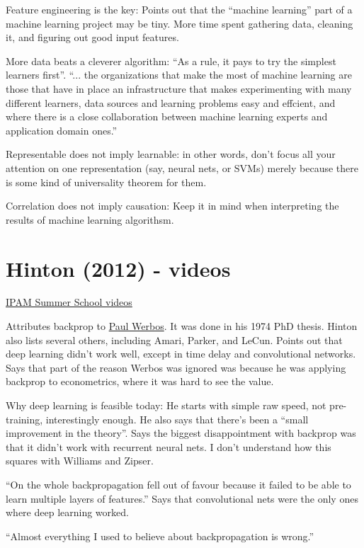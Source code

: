 \documentclass[12pt]{report}
\newcommand{\link}[2]{\href{#1}{#2}}
\begin{document}
Feature engineering is the key: Points out that the ``machine
learning'' part of a machine learning project may be tiny.  More time
spent gathering data, cleaning it, and figuring out good input
features.

More data beats a cleverer algorithm: ``As a rule, it pays to try the
simplest learners first''.  ``... the organizations that make the most
of machine learning are those that have in place an infrastructure
that makes experimenting with many different learners, data sources
and learning problems easy and effcient, and where there is a close
collaboration between machine learning experts and application domain
ones.''

Representable does not imply learnable: in other words, don't focus
all your attention on one representation (say, neural nets, or SVMs)
merely because there is some kind of universality theorem for them.

Correlation does not imply causation: Keep it in mind when
interpreting the results of machine learning algorithsm.

\section{Hinton (2012) - videos}

\link{https://www.ipam.ucla.edu/schedule.aspx?pc=gss2012}{IPAM Summer School videos}

Attributes backprop to \link{http://www.werbos.com/}{Paul Werbos}.  It
was done in his 1974 PhD thesis.  Hinton also lists several others,
including Amari, Parker, and LeCun.  Points out that deep learning
didn't work well, except in time delay and convolutional networks.
Says that part of the reason Werbos was ignored was because he was
applying backprop to econometrics, where it was hard to see the value.

Why deep learning is feasible today: He starts with simple raw speed,
not pre-training, interestingly enough.  He also says that there's
been a ``small improvement in the theory''.  Says the biggest
disappointment with backprop was that it didn't work with recurrent
neural nets.  I don't understand how this squares with Williams and
Zipser.  

``On the whole backpropagation fell out of favour because it failed to
be able to learn multiple layers of features.''  Says that
convolutional nets were the only ones where deep learning worked.

``Almost everything I used to believe about backpropagation is
wrong.''
\end{document}

